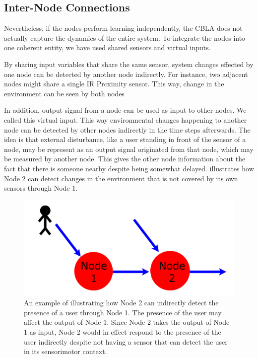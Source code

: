 \subsection{Inter-Node Connections}

Nevertheless, if the nodes perform learning independently, the CBLA does not actually capture the dynamics of the entire system. To integrate the nodes into one coherent entity, we have used shared sensors and virtual inputs.

By sharing input variables that share the same sensor, system changes effected by one node can be detected by another node indirectly. For instance, two adjacent nodes might share a single IR Proximity sensor. This way, change in the environment can be seen by both nodes

In addition, output signal from a node can be used as input to other nodes. We called this virtual input. This way environmental changes happening to another node can be detected by other nodes indirectly in the time steps afterwards. The idea is that external disturbance, like a user standing in front of the sensor of a node, may be represent as an output signal originated from that node, which may be measured by another node. This gives the other node information about the fact that there is someone nearby despite being somewhat delayed.  illustrates how Node 2 can detect changes in the environment that is not covered by its own sensors through Node 1.


\begin{figure}[!htbp]
	\centering
	\includegraphics[height=0.20 \textheight]{"fig/cbla/Indirect input diagram"}
	\caption[Illustration explaining how virtual inputs may be used to detect changes outside of a node's sensorimotor context]{An example of illustrating how Node 2 can indirectly detect the presence of a user through Node 1. The presence of the user may affect the output of Node 1. Since Node 2 takes the output of Node 1 as input, Node 2 would in effect respond to the presence of the user indirectly despite not having a sensor that can detect the user in its sensorimotor context.}
	\label{fig:Indirect input diagram}
\end{figure}

\FloatBarrier  

